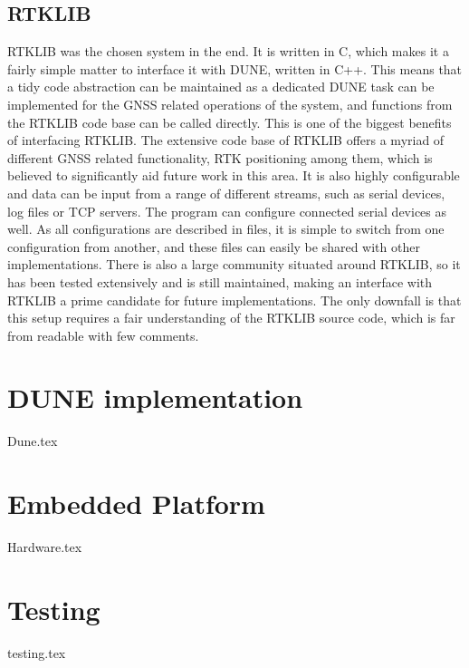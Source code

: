     \subsection{RTKLIB}
    RTKLIB was the chosen system in the end. It is written in C, which makes it a fairly simple matter to interface it with DUNE, written in C++. This means that a tidy code abstraction can be maintained as a dedicated DUNE task can be implemented for the GNSS related operations of the system, and functions from the RTKLIB code base can be called directly. This is one of the biggest benefits of interfacing RTKLIB. The extensive code base of RTKLIB offers a myriad of different GNSS related functionality, RTK positioning among them, which is believed to significantly aid future work in this area. It is also highly configurable and data can be input from a range of different streams, such as serial devices, log files or TCP servers. The program can configure connected serial devices as well. As all configurations are described in files, it is simple to switch from one configuration from another, and these files can easily be shared with other implementations. There is also a large community situated around RTKLIB, so it has been tested extensively and is still maintained, making an interface with RTKLIB a prime candidate for future implementations. The only downfall is that this setup requires a fair understanding of the RTKLIB source code, which is far from readable with few comments.
    
\section{DUNE implementation}
    {Dune.tex}
    
\section{Embedded Platform}
    {Hardware.tex}

\section{Testing}
    {testing.tex}
        


%           
        
